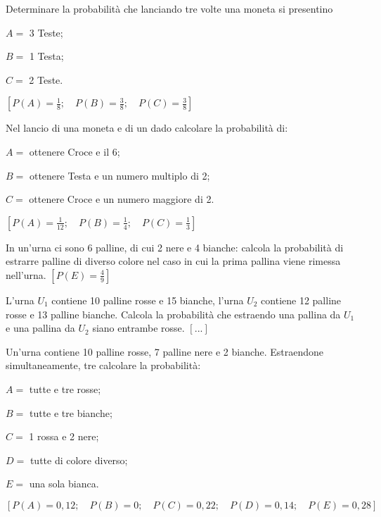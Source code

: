 \begin{esercizio}[\Ast]
 \label{ese:9.56}
Determinare la probabilità che lanciando tre volte una moneta si presentino
\begin{itemize*}
\item $ A= $ 3 Teste;
\item $ B= $ 1 Testa;
\item $ C= $ 2 Teste.
\end{itemize*}
\hfill $\left[P(A)=\frac 1 8; \quad P(B)=\frac3 8; \quad P(C)=\frac 3 8\right]$
\end{esercizio}

\begin{esercizio}[\Ast]
 \label{ese:9.57}
Nel lancio di una moneta e di un dado calcolare la probabilità di:
\begin{itemize*}
\item $ A= $ ottenere Croce e il 6;
\item $ B= $ ottenere Testa e un numero multiplo di 2;
\item $ C= $ ottenere Croce e un numero maggiore di 2.
\end{itemize*}
\hfill $\left[P(A)=\frac 1 {12}; \quad P(B)=\frac1 4; \quad 
P(C)=\frac 1 3\right]$
\end{esercizio}

\begin{esercizio}[\Ast]
 \label{ese:9.58}
In un'urna ci sono 6 palline, di cui 2 nere e 4 bianche: calcola la probabilità 
di estrarre palline di diverso colore nel caso in cui la prima pallina viene 
rimessa nell'urna.
\hfill $\left[P(E)=\frac 4 9\right]$
\end{esercizio}

\begin{esercizio}
 \label{ese:9.59}
L'urna $ U_1 $ contiene 10 palline rosse e 15 bianche, l'urna $ U_2 $ contiene 
12 palline rosse e 13 palline bianche. Calcola la probabilità che estraendo una 
pallina da $ U_1 $ e una pallina da $ U_2 $ siano entrambe rosse.
\hfill $\left[...\right]$
\end{esercizio}

\begin{esercizio}[\Ast]
 \label{ese:9.60}
 Un'urna contiene 10 palline rosse, 7 palline nere e 2 bianche. Estraendone 
simultaneamente, tre calcolare la probabilità:
\begin{itemize*}
 \item $ A= $ tutte e tre rosse;
 \item $ B= $ tutte e tre bianche;
 \item $ C= $ 1 rossa e 2 nere;
 \item $ D= $ tutte di colore diverso;
 \item $ E= $ una sola bianca.
\end{itemize*}
\hfill $\left[P(A)=0,12; \quad P(B)=0; \quad P(C)=0,22; \quad P(D)=0,14; \quad 
P(E)=0,28\right]$
\end{esercizio}

